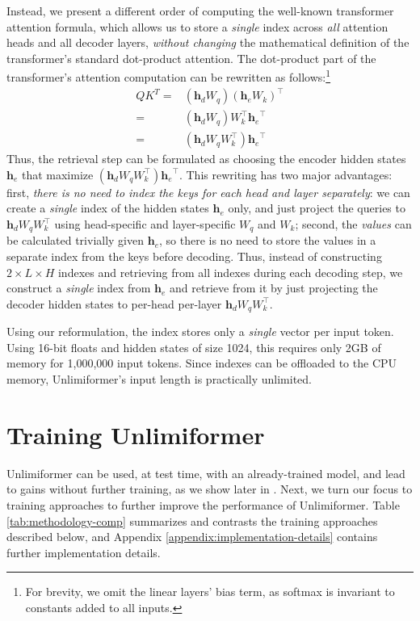 \documentclass{article}
\newcommand{\ours}{Unlimiformer\xspace}
\def\vh{{\bm{h}}}
\begin{document}
 Instead, we present a different order of computing the well-known transformer attention formula, which allows us to store a \emph{single} index across \emph{all} attention heads and all decoder layers, \emph{without changing} the mathematical definition of the transformer's standard dot-product attention.
The dot-product part of the  transformer's attention computation can be rewritten as follows:\footnote{For brevity, we omit the linear layers' bias term, as softmax is invariant to constants added to all inputs.}
\begin{align}
    QK^T = &\left({\vh_d}W_q\right)\left({\vh_e}W_k\right)^{\top} \\
         = &\left({\vh_d}W_q\right)W_k^{\top}{\vh_e}^{\top} \nonumber \\
        = &\left({\vh_d}W_qW_k^{\top}\right){\vh_e}^{\top} \nonumber 
\end{align}
Thus, the retrieval step can be formulated as choosing the encoder hidden states $\vh_e$ that maximize $\left({\vh_d}W_qW_k^{\top}\right){\vh_e}^{\top}$. This rewriting has two major advantages: first, 
\emph{there is no need to index the keys for each head and layer separately}: we can create a \emph{single} index of the hidden states $\vh_e$ only, and just project the queries to ${\vh_d}W_qW_k^{\top}$ using head-specific and layer-specific $W_q$ and $W_k$; 
second, the \emph{values} can be calculated trivially given $\vh_e$, so there is no need to store the values in a separate index from the keys 
before decoding.
Thus, instead of constructing $2\times L \times H$ indexes and retrieving from all indexes during each decoding step, we construct a \emph{single} index from $\vh_e$ and retrieve from it by just projecting the decoder hidden states to per-head per-layer ${\vh_d}W_qW_k^{\top}$. %

Using our reformulation, the index stores only a \emph{single} vector per input token. Using 16-bit floats and hidden states of size 1024, this requires only 2GB of memory for 1,000,000 input tokens.
Since indexes can be offloaded to the CPU memory, \ours's input length is practically unlimited.




\section{Training \ours}
\ours
can be used, at test time, with an already-trained model, and lead to gains without further training, as we show later in . 
Next, we turn our focus to training approaches to further improve the performance of \ours. 
Table \ref{tab:methodology-comp} summarizes and contrasts the training approaches described below, and Appendix \ref{appendix:implementation-details} contains further implementation details.
\end{document}
